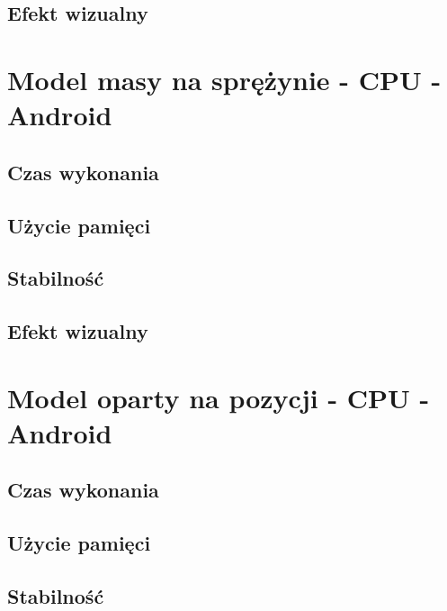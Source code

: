 		\subsection{Efekt wizualny}
		\label{t:wyniki:poz_gpu_andro:wizual}
	
	
	\section{Model masy na sprężynie - CPU - Android}
	\label{t:wyniki:masa_cpu_andro}
	
		\subsection{Czas wykonania}
		\label{t:wyniki:masa_cpu_andro:czas}
		
		\subsection{Użycie pamięci}
		\label{t:wyniki:masa_cpu_andro:pamiec}
		
		\subsection{Stabilność}
		\label{t:wyniki:masa_cpu_andro:stabilnosc}
		
		\subsection{Efekt wizualny}
		\label{t:wyniki:masa_cpu_andro:wizual}
		
	
	\section{Model oparty na pozycji - CPU - Android}
	\label{t:wyniki:poz_cpu_andro}
	
		\subsection{Czas wykonania}
		\label{t:wyniki:poz_cpu_andro:czas}
		
		\subsection{Użycie pamięci}
		\label{t:wyniki:poz_cpu_andro:pamiec}
		
		\subsection{Stabilność}
		\label{t:wyniki:poz_cpu_andro:stabilnosc}
		
